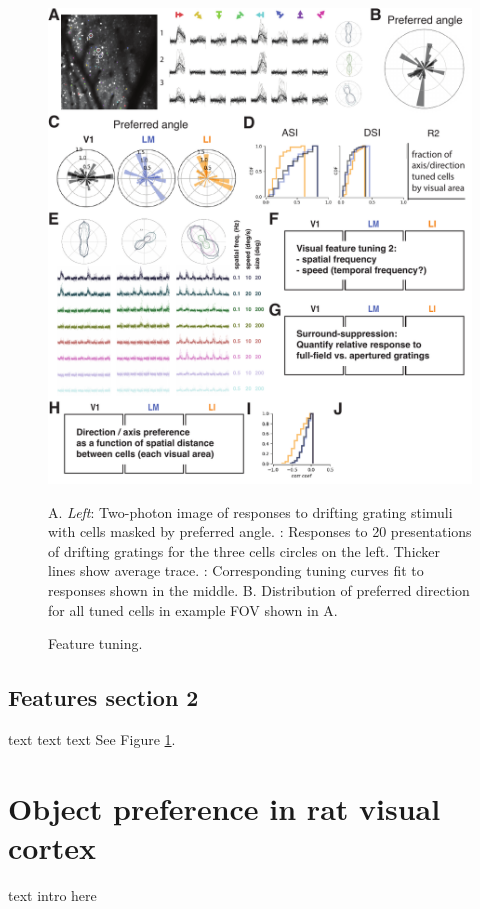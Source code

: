 \documentclass{article}
\begin{document}
\begin{figure}[ht]
  \includegraphics[width=\textwidth]{figures/features.pdf}
  \caption{Feature tuning.}
  \medskip
  \small
  A.  \textit{Left}:  Two-photon image of responses to drifting grating stimuli with cells masked by preferred angle. :  Responses to 20 presentations of drifting gratings for the three cells circles on the left. Thicker lines show average trace. :  Corresponding tuning curves fit to responses shown in the middle. 
  B.  Distribution of preferred direction for all tuned cells in example FOV shown in A.
  
  \label{fig:fig3}
\end{figure}

\subsection{Features section 2}
text text text
See Figure \ref{fig:fig3}.


\section{Object preference in rat visual cortex}
text intro here
\end{document}
